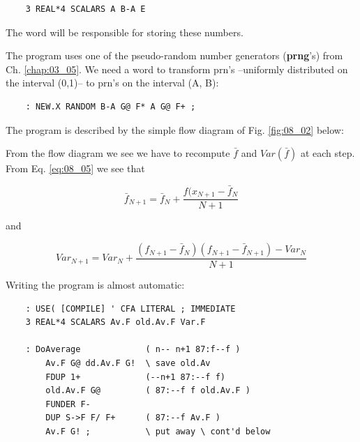 \begin{lstlisting}
    3 REAL*4 SCALARS A B-A E
\end{lstlisting}

The word  will be responsible for storing these numbers.

The program uses one of the pseudo-random number generators (\textbf{prng}'s) from Ch. \ref{chap:03_05}. We need a word to transform prn's --uniformly distributed on the interval (0,1)-- to prn's on the interval (A, B):

\begin{lstlisting}
    : NEW.X RANDOM B-A G@ F* A G@ F+ ;
\end{lstlisting}

The program is described by the simple flow diagram of Fig. \ref{fig:08_02} below:



From the flow diagram we see we have to recompute $\bar{f}$ and $Var(\bar{f})$ at each step. From Eq. \ref{eq:08_05} we see that

\begin{equation*}
\bar{f}_{N+1} = \bar{f}_N + \frac{f(x_{N+1} - \bar{f}_{N}}{N + 1}
\end{equation*}

and

\begin{equation*}
Var_{N+1} = Var_{N} + \frac{(f_{N+1}-\bar{f}_{N})(f_{N+1} - \bar{f}_{N+1})-Var_{N}}{N+1}
\end{equation*}

Writing the program is almost automatic:

\begin{lstlisting}
    : USE( [COMPILE] ' CFA LITERAL ; IMMEDIATE
    3 REAL*4 SCALARS Av.F old.Av.F Var.F

    : DoAverage             ( n-- n+1 87:f--f )
        Av.F G@ dd.Av.F G!  \ save old.Av
        FDUP 1+             (--n+1 87:--f f)
        old.Av.F G@         ( 87:--f f old.Av.F )
        FUNDER F-
        DUP S->F F/ F+      ( 87:--f Av.F )
        Av.F G! ;           \ put away \ cont'd below
\end{lstlisting}

